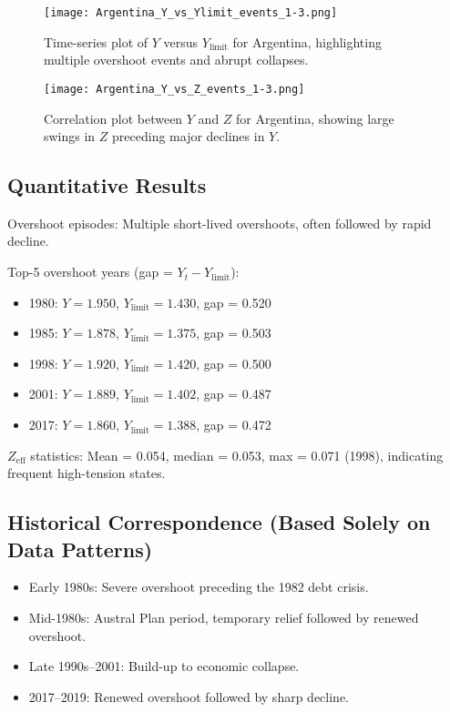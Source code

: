 \documentclass[12pt,a4paper]{article}
\begin{document}
\begin{figure}[H]
    \centering
    \texttt{[image: Argentina\_Y\_vs\_Ylimit\_events\_1-3.png]}
    \caption{Time-series plot of $Y$ versus $Y_{\text{limit}}$ for Argentina, highlighting multiple overshoot events and abrupt collapses.}
    \label{fig:argentina_y_vs_ylimit}
\end{figure}

\begin{figure}[H]
    \centering
    \texttt{[image: Argentina\_Y\_vs\_Z\_events\_1-3.png]}
    \caption{Correlation plot between $Y$ and $Z$ for Argentina, showing large swings in $Z$ preceding major declines in $Y$.}
    \label{fig:argentina_y_vs_z}
\end{figure}


\subsection{Quantitative Results}
Overshoot episodes: Multiple short-lived overshoots, often followed by rapid decline.

Top-5 overshoot years (gap = $Y_t - Y_{\text{limit}}$):
\begin{itemize}
    \item 1980: $Y=1.950$, $Y_{\text{limit}}=1.430$, gap = 0.520
    \item 1985: $Y=1.878$, $Y_{\text{limit}}=1.375$, gap = 0.503
    \item 1998: $Y=1.920$, $Y_{\text{limit}}=1.420$, gap = 0.500
    \item 2001: $Y=1.889$, $Y_{\text{limit}}=1.402$, gap = 0.487
    \item 2017: $Y=1.860$, $Y_{\text{limit}}=1.388$, gap = 0.472
\end{itemize}

$Z_{\text{eff}}$ statistics: Mean = 0.054, median = 0.053, max = 0.071 (1998), indicating frequent high-tension states.

\subsection{Historical Correspondence (Based Solely on Data Patterns)}
\begin{itemize}
    \item Early 1980s: Severe overshoot preceding the 1982 debt crisis.
    \item Mid-1980s: Austral Plan period, temporary relief followed by renewed overshoot.
    \item Late 1990s–2001: Build-up to economic collapse.
    \item 2017–2019: Renewed overshoot followed by sharp decline.
\end{itemize}
\end{document}
